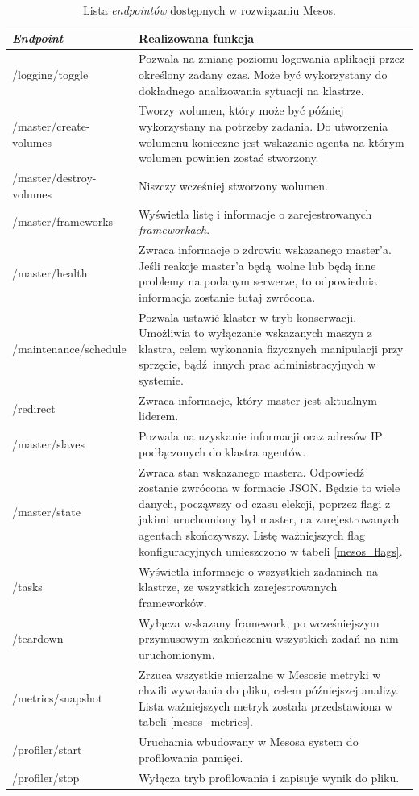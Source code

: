 \documentclass[10pt,a4paper,titlepage,twoside]{report}
\begin{document}
\begin{table}[!htbp]
\caption{Lista \textit{endpointów} dostępnych w rozwiązaniu Mesos.}
\label{mesos_endpoints}
\centering
\begin{tabular}{|p{4cm}|p{10cm}|}
  \hline
  \textbf{\textit{Endpoint}} & \textbf{Realizowana funkcja} \\
  \hline
  /logging/toggle & Pozwala na zmianę poziomu logowania aplikacji przez określony zadany czas. Może być wykorzystany do dokładnego analizowania sytuacji na klastrze.\\
  \hline
  /master/create-volumes & Tworzy wolumen, który może być później wykorzystany na potrzeby zadania. Do utworzenia wolumenu konieczne jest wskazanie agenta na którym wolumen powinien zostać stworzony. \\
  \hline
  /master/destroy-volumes & Niszczy wcześniej stworzony wolumen. \\
  \hline
  /master/frameworks & Wyświetla listę i informacje o zarejestrowanych \textit{frameworkach}. \\
  \hline
  /master/health & Zwraca informacje o zdrowiu wskazanego master'a. Jeśli reakcje master'a będą wolne lub będą inne problemy na podanym serwerze, to odpowiednia informacja zostanie tutaj zwrócona. \\
  \hline
  /maintenance/schedule & Pozwala ustawić klaster w tryb konserwacji. Umożliwia to wyłączanie wskazanych maszyn z klastra, celem wykonania fizycznych manipulacji przy sprzęcie, bądź innych prac administracyjnych w systemie. \\
  \hline
  /redirect & Zwraca informacje, który master jest aktualnym liderem. \\
  \hline
  /master/slaves & Pozwala na uzyskanie informacji oraz adresów IP podłączonych do klastra agentów. \\
  \hline
  /master/state & Zwraca stan wskazanego mastera. Odpowiedź zostanie zwrócona w formacie JSON. Będzie to wiele danych, począwszy od czasu elekcji, poprzez flagi z jakimi uruchomiony był master, na zarejestrowanych agentach skończywszy. Listę ważniejszych flag konfiguracyjnych umieszczono w tabeli \ref{mesos_flags}. \\
  \hline
  /tasks & Wyświetla informacje o wszystkich zadaniach na klastrze, ze wszystkich zarejestrowanych frameworków. \\
  \hline
  /teardown & Wyłącza wskazany framework, po wcześniejszym przymusowym zakończeniu wszystkich zadań na nim uruchomionym. \\
  \hline
  /metrics/snapshot & Zrzuca wszystkie mierzalne w Mesosie metryki w chwili wywołania do pliku, celem późniejszej analizy. Lista ważniejszych metryk została przedstawiona w tabeli \ref{mesos_metrics}.\\
  \hline
  /profiler/start & Uruchamia wbudowany w Mesosa system do profilowania pamięci. \\
  \hline
  /profiler/stop & Wyłącza tryb profilowania i zapisuje wynik do pliku. \\
  \hline
\end{tabular}
\end{table}
\end{document}
